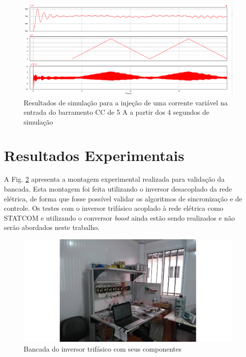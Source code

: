 \begin{figure}[!hbt]
	\begin{center}
    \includegraphics[width=\textwidth]{figuras/sim_figures/controle_corrente/simulacao_controle_corrente.PNG}
    \caption{Resultados de simulação para a injeção de uma corrente variável na entrada do barramento CC de 5 A a partir dos 4 segundos de simulação}
    \label{fig:sim-controle-corrente}
    \end{center}
\end{figure}

\section{Resultados Experimentais}

A Fig. \ref{fig:res-bancada-inversor} apresenta a montagem experimental realizada para validação da bancada.
Esta montagem foi feita utilizando o inversor desacoplado da rede elétrica, de forma que fosse possível validar
os algoritmos de sincronização e de controle. Os testes com o inversor trifásico acoplado à rede elétrica como STATCOM e
utilizando o conversor \textit{boost} ainda estão sendo realizados e não serão abordados neste trabalho.

\begin{figure}[!hbt]
	\begin{center}
    \includegraphics[width=\textwidth]{figuras/resultados-montagem-laboratorial.png}
    \caption{Bancada do inversor trifásico com seus componentes}
    \label{fig:res-bancada-inversor}
    \end{center}
\end{figure}


